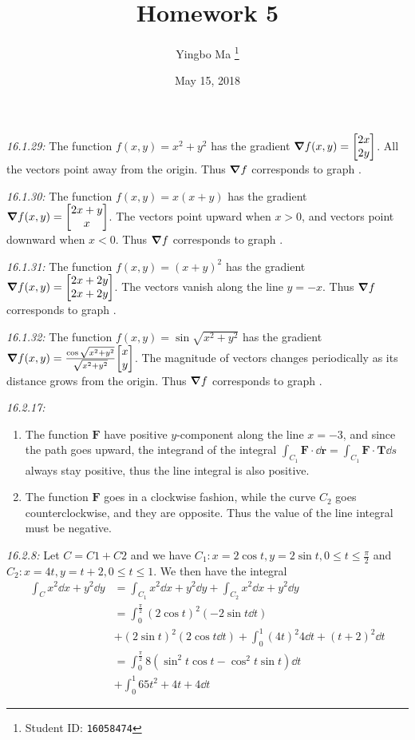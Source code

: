 \documentclass[8pt,twocolumn]{article}
\author{Yingbo Ma \thanks{Student ID: \tt{16058474}}}
\title{\vspace{-1.cm}Homework 5}
\date{May 15, 2018}
\begin{document}
\maketitle

\begin{Answer}[number=29]
  \emph{16.1.29:}
  The function $f(x,y) = x^2 + y^2$ has the gradient $\grad f(x,y) =
  \mqty[2x\\2y]$. All the vectors point away from the origin.
  Thus $\grad f$ corresponds to graph .

  \emph{16.1.30:}
  The function $f(x,y) = x(x+y)$ has the gradient $\grad f(x,y) =
  \mqty[2x+y\\x]$. The vectors point upward when $x>0$, and vectors point
  downward when $x<0$.
  Thus $\grad f$ corresponds to graph .

  \emph{16.1.31:}
  The function $f(x,y) = (x+y)^2$ has the gradient $\grad f(x,y) =
  \mqty[2x+2y\\2x+2y]$. The vectors vanish along the line $y=-x$.
  Thus $\grad f$ corresponds to graph .

  \emph{16.1.32:}
  The function $f(x,y) = \sin \sqrt{x^2+y^2}$ has the gradient $\grad f(x,y) =
  \frac{\cos\sqrt{x^2+y^2}}{\sqrt{x^2+y^2}}\mqty[x\\y]$. The magnitude of
  vectors changes periodically as its distance grows from the origin.
  Thus $\grad f$ corresponds to graph .

  \emph{16.2.17:}
  \begin{enumerate}
    \item
      The function $\bm{F}$ have positive $y$-component along the line $x=-3$, and
      since the path goes upward, the integrand of the integral
      $\int_{C_1}\bm{F}\cdot \dd{\bm{r}} = \int_{C_1}\bm{F}\cdot\bm{T} \dd{s}$ always
      stay positive, thus the line integral is also positive.
    \item
      The function $\bm{F}$ goes in a clockwise fashion, while the curve $C_2$
      goes counterclockwise, and they are opposite. Thus the value of the line
      integral must be negative.
  \end{enumerate}

  \emph{16.2.8:}
  Let $C = C1 + C2$ and we have $C_1: x=2\cos t, y=2\sin t, 0\le t \le
  \frac{\pi}{2}$ and $C_2: x=4t, y=t+2, 0\le t\le 1$. We then have the integral
  \begin{align*}
    \int_C x^2\dd{x}+y^2\dd{y} &= \int_{C_1} x^2\dd{x}+y^2\dd{y} + \int_{C_2}
    x^2\dd{x}+y^2\dd{y} \\
    &= \int_0^{\frac{\pi}{2}}(2\cos t)^2 (-2\sin t\dd{t}) \\
    &+ (2\sin t)^2 (2\cos t\dd{t}) + \int_0^1 (4t)^2 4\dd{t} + (t+2)^2 \dd{t}
    \\
    &= \int_0^{\frac{\pi}{2}}8 (\sin^2 t \cos t - \cos^2 t\sin t)\dd{t} \\
    &+\int_0^1 65t^2+4t+4 \dd{t}
  \end{align*}
\end{Answer}
\end{document}
